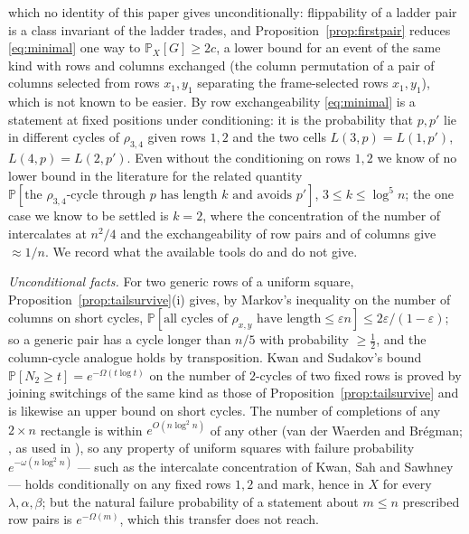 \documentclass[11pt]{article}
\theoremstyle{definition}
\renewcommand{\Pr}{\mathbb{P}}
\begin{document}
which no identity of this paper gives unconditionally: flippability of a ladder pair is a
class invariant of the ladder trades, and Proposition~\ref{prop:firstpair} reduces
\eqref{eq:minimal} one way to $\Pr_X[G]\ge2c$, a lower bound for an event of the same kind
with rows and columns exchanged (the column permutation of a pair of columns selected from
rows $x_1,y_1$ separating the frame-selected rows $x_1,y_1$), which is not known to be
easier.  By row exchangeability \eqref{eq:minimal} is a statement at fixed positions under
conditioning: it is the probability that $p,p'$ lie in different cycles of $\rho_{3,4}$
given rows $1,2$ and the two cells $L(3,p)=L(1,p')$, $L(4,p)=L(2,p')$.  Even without the
conditioning on rows $1,2$ we know of no lower bound in the literature for the related
quantity $\Pr[\text{the }\rho_{3,4}\text{-cycle through }p\text{ has length }k\text{ and avoids }p']$,
$3\le k\le\log^5n$; the one case we know to be settled is $k=2$, where the concentration
of the number of intercalates at $n^2/4$ \cite{KSS21} and the exchangeability of row
pairs and of columns give $\approx1/n$.  We record what
the available tools do and do not give.

\emph{Unconditional facts.}  For two generic rows of a uniform square,
Proposition~\ref{prop:tailsurvive}(i) gives, by Markov's inequality on the number of
columns on short cycles, $\Pr[\text{all cycles of }\rho_{x,y}\text{ have length}\le\varepsilon n]\le2\varepsilon/(1-\varepsilon)$;
so a generic pair has a cycle longer than $n/5$ with probability $\ge\tfrac12$, and the
column-cycle analogue holds by transposition.  Kwan and Sudakov's bound
$\Pr[N_2\ge t]=e^{-\Omega(t\log t)}$ on the number of $2$-cycles of two fixed rows
\cite[Thm.~3]{KS18} is proved by joining switchings of the same kind as those of
Proposition~\ref{prop:tailsurvive} and is likewise an upper bound on short cycles.  The
number of completions of any $2\times n$ rectangle is within $e^{O(n\log^2n)}$ of any other
(van der Waerden and Br\'egman; \cite[Prop.~4]{MW99}, as used in \cite{KSSS23}), so any property of uniform squares
with failure probability $e^{-\omega(n\log^2n)}$ --- such as the intercalate concentration
of Kwan, Sah and Sawhney \cite{KSS21} --- holds conditionally on any fixed rows $1,2$ and
mark, hence in $X$ for every $\lambda,\alpha,\beta$; but the natural failure probability of a
statement about $m\le n$ prescribed row pairs is $e^{-\Omega(m)}$, which this transfer does
not reach.
\end{document}
